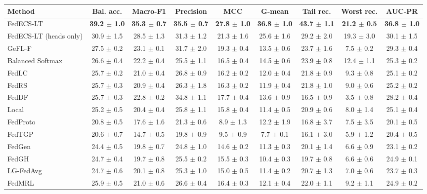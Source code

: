 \begin{tabular}{lcccccccc}
\toprule
Method & Bal. acc. & Macro-F1 & Precision & MCC & G-mean & Tail rec. & Worst rec. & AUC-PR\\
\midrule
FedECS-LT & \textbf{39.2 $\pm$ 1.0} & \textbf{35.3 $\pm$ 0.7} & \textbf{35.5 $\pm$ 0.7} & \textbf{27.8 $\pm$ 1.0} & \textbf{36.8 $\pm$ 1.0} & \textbf{43.7 $\pm$ 1.1} & \textbf{21.2 $\pm$ 0.5} & \textbf{36.8 $\pm$ 1.0}\\
FedECS-LT (heads only) & 30.9 $\pm$ 1.5 & 28.5 $\pm$ 1.3 & 31.3 $\pm$ 1.2 & 21.3 $\pm$ 1.6 & 25.6 $\pm$ 1.6 & 29.2 $\pm$ 2.0 & 19.3 $\pm$ 3.0 & 30.1 $\pm$ 1.5\\
GeFL-F & 27.5 $\pm$ 0.2 & 23.1 $\pm$ 0.1 & 31.7 $\pm$ 2.0 & 19.3 $\pm$ 0.4 & 13.5 $\pm$ 0.6 & 23.7 $\pm$ 1.6 & 7.5 $\pm$ 0.2 & 29.3 $\pm$ 0.4\\
Balanced Softmax & 26.6 $\pm$ 0.4 & 22.2 $\pm$ 0.4 & 25.5 $\pm$ 1.1 & 16.5 $\pm$ 0.4 & 14.5 $\pm$ 0.6 & 23.9 $\pm$ 0.8 & 12.4 $\pm$ 1.1 & 25.3 $\pm$ 0.2\\
FedLC & 25.7 $\pm$ 0.2 & 21.0 $\pm$ 0.4 & 26.8 $\pm$ 0.9 & 16.2 $\pm$ 0.2 & 12.0 $\pm$ 0.4 & 21.8 $\pm$ 0.9 & 9.3 $\pm$ 0.8 & 25.1 $\pm$ 0.2\\
FedRS & 25.7 $\pm$ 0.3 & 20.9 $\pm$ 0.4 & 26.3 $\pm$ 1.8 & 16.3 $\pm$ 0.2 & 11.9 $\pm$ 0.4 & 21.8 $\pm$ 1.0 & 9.0 $\pm$ 0.6 & 25.2 $\pm$ 0.2\\
FedDF & 25.7 $\pm$ 0.3 & 22.8 $\pm$ 0.2 & 34.8 $\pm$ 1.1 & 17.7 $\pm$ 0.4 & 13.6 $\pm$ 0.9 & 16.5 $\pm$ 0.9 & 3.5 $\pm$ 0.8 & 28.2 $\pm$ 0.4\\
Local & 25.2 $\pm$ 0.5 & 20.4 $\pm$ 0.4 & 25.8 $\pm$ 1.1 & 15.8 $\pm$ 0.4 & 11.4 $\pm$ 0.5 & 20.9 $\pm$ 0.6 & 8.0 $\pm$ 1.4 & 25.1 $\pm$ 0.4\\
FedProto & 20.8 $\pm$ 0.5 & 17.6 $\pm$ 1.6 & 21.3 $\pm$ 0.6 & 8.9 $\pm$ 1.3 & 12.2 $\pm$ 1.9 & 16.8 $\pm$ 3.7 & 7.5 $\pm$ 3.5 & 20.1 $\pm$ 0.5\\
FedTGP & 20.6 $\pm$ 0.7 & 14.7 $\pm$ 0.5 & 19.8 $\pm$ 0.9 & 9.5 $\pm$ 0.9 & 7.7 $\pm$ 0.1 & 16.1 $\pm$ 3.0 & 5.9 $\pm$ 1.2 & 20.4 $\pm$ 0.5\\
FedGen & 24.4 $\pm$ 0.5 & 19.8 $\pm$ 0.7 & 24.8 $\pm$ 1.0 & 14.6 $\pm$ 0.2 & 11.3 $\pm$ 0.3 & 20.1 $\pm$ 1.4 & 6.6 $\pm$ 0.9 & 23.1 $\pm$ 0.2\\
FedGH & 24.7 $\pm$ 0.4 & 19.7 $\pm$ 0.8 & 25.5 $\pm$ 0.2 & 15.5 $\pm$ 0.3 & 10.4 $\pm$ 0.3 & 19.7 $\pm$ 0.8 & 6.6 $\pm$ 0.6 & 24.9 $\pm$ 0.1\\
LG-FedAvg & 24.7 $\pm$ 0.6 & 20.1 $\pm$ 0.8 & 25.3 $\pm$ 1.0 & 15.0 $\pm$ 0.5 & 11.4 $\pm$ 0.2 & 20.7 $\pm$ 1.3 & 7.0 $\pm$ 0.6 & 23.7 $\pm$ 0.3\\
FedMRL & 25.9 $\pm$ 0.5 & 21.0 $\pm$ 0.6 & 26.6 $\pm$ 0.4 & 16.4 $\pm$ 0.3 & 12.1 $\pm$ 0.4 & 22.0 $\pm$ 1.1 & 9.2 $\pm$ 1.1 & 24.9 $\pm$ 0.2\\
\bottomrule
\end{tabular}
